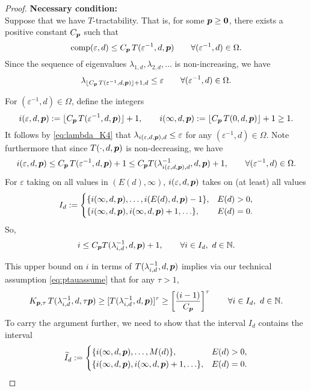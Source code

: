 \documentclass[11pt,a4paper]{article}
\newcommand{\tI}{\widetilde{I}}
\begin{document}
\begin{proof}
\noindent \textbf{Necessary condition:}\\
Suppose that we have
$T$-tractability. That is, for some $\boldsymbol{p} \ge \boldsymbol{0}$, there exists a positive constant $C_{\boldsymbol{p}}$ such that
\[
\operatorname{comp}(\varepsilon,d)\le C_{\boldsymbol{p}}\, T(\varepsilon^{-1},d,\boldsymbol{p}) \qquad \forall (\varepsilon^{-1}, d) \in \Omega.
\]
Since the sequence of eigenvalues $\lambda_{1,d}, \lambda_{2,d}, \ldots $ is non-increasing, we have
\begin{equation}\label{eq:lambda_K4}
	\lambda_{\lfloor C_{\boldsymbol{p}}\, T(\varepsilon^{-1},d,\boldsymbol{p})\rfloor +1,d}\le \varepsilon \qquad 
 \forall (\varepsilon^{-1}, d) \in \Omega.
\end{equation}

For $(\varepsilon^{-1}, d) \in \Omega$, define the integers 
\[
i (\varepsilon,d,\boldsymbol{p}):= \lfloor C_{\boldsymbol{p}}\, T(\varepsilon^{-1},d,\boldsymbol{p})\rfloor +1, \qquad
i (\infty,d,\boldsymbol{p}) := \lfloor C_{\boldsymbol{p}}\, T(0,d,\boldsymbol{p})\rfloor +1 \ge 1.
\]
It follows by \eqref{eq:lambda_K4} that $\lambda_{i(\varepsilon,d,\boldsymbol{p}),d} \le \varepsilon$
for any  $(\varepsilon^{-1}, d) \in \Omega$.
Note furthermore that since $T(\cdot,d,\boldsymbol{p})$ is non-decreasing, we have
\[
i(\varepsilon,d,\boldsymbol{p})\le C_{\boldsymbol{p}}\, T(\varepsilon^{-1},d,\boldsymbol{p})+1 \le C_{\boldsymbol{p}} T(\lambda_{i(\varepsilon,d,\boldsymbol{p}),d}^{-1},d,\boldsymbol{p})+1, \qquad \forall (\varepsilon^{-1},d)\in\Omega.
\]
For $\varepsilon$ taking on all values in $(E(d),\infty)$, $i(\varepsilon,d,\boldsymbol{p})$ takes on (at least) all values 
\[
I_{d}:=\begin{cases} 
\{i(\infty,d,\boldsymbol{p}),\ldots, i(E(d),d,\boldsymbol{p})-1\}, & E(d) > 0, \\
\{i(\infty,d,\boldsymbol{p}), i(\infty,d,\boldsymbol{p}) + 1, \ldots\}, & E(d) = 0.
\end{cases}
\]
So,
\[
i\le  C_{\boldsymbol{p}} T(\lambda_{i,d}^{-1},d,\boldsymbol{p})+1, \qquad \forall i\in I_{d},  \ d \in \mathbb{N}.
\]

This upper bound on $i$ in terms of $T(\lambda_{i,d}^{-1},d,\boldsymbol{p})$ implies via our technical assumption \eqref{eq:ptauassume} that for any $\tau > 1$,
\begin{equation}\label{eq:restrictKfive}
	K_{\boldsymbol{p},\tau}\,T (\lambda_{i,d}^{-1},d,\tau \boldsymbol{p}) \ge
	[T(\lambda_{i,d}^{-1},d, \boldsymbol{p})]^\tau
	\ge
	\left[\frac{(i-1)}{C_{\boldsymbol{p}}}\right]^\tau \qquad  \forall i\in I_{d},  \ d \in \mathbb{N}.
 \end{equation}
To carry the argument further, we need to show that the interval $I_d$ contains the interval
\[
\tI_{d}:=\begin{cases} 
\{i(\infty,d,\vp),\ldots, M(d)\}, & E(d) > 0, \\
\{i(\infty,d,\vp), i(\infty,d,\vp) + 1, \ldots\}, & E(d) = 0.
\end{cases}
\]


\end{proof}
\end{document}
